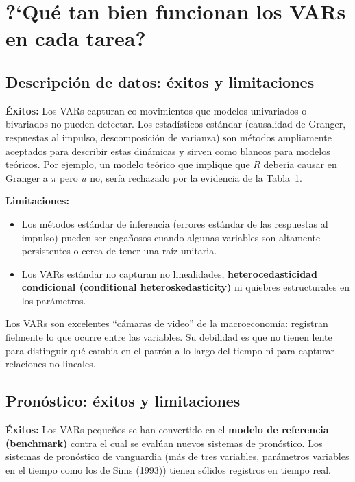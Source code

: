 \documentclass[12pt]{article}
\begin{document}
\section{?`Qu\'e tan bien funcionan los VARs en cada tarea?}

\subsection{Descripci\'on de datos: \'exitos y limitaciones}

\textbf{\'Exitos:} Los VARs capturan co-movimientos que modelos univariados o bivariados no pueden detectar. Los estad\'isticos est\'andar (causalidad de Granger, respuestas al impulso, descomposici\'on de varianza) son m\'etodos ampliamente aceptados para describir estas din\'amicas y sirven como blancos para modelos te\'oricos. Por ejemplo, un modelo te\'orico que implique que $R$ deber\'ia causar en Granger a $\pi$ pero $u$ no, ser\'ia rechazado por la evidencia de la Tabla~1.

\textbf{Limitaciones:}
\begin{itemize}
  \item Los m\'etodos est\'andar de inferencia (errores est\'andar de las respuestas al impulso) pueden ser enga\~nosos cuando algunas variables son altamente persistentes o cerca de tener una ra\'iz unitaria.
  \item Los VARs est\'andar no capturan no linealidades, \textbf{heterocedasticidad condicional (conditional heteroskedasticity)} ni quiebres estructurales en los par\'ametros.
\end{itemize}

\begin{intuicion}
Los VARs son excelentes ``c\'amaras de video'' de la macroeconom\'ia: registran fielmente lo que ocurre entre las variables. Su debilidad es que no tienen lente para distinguir qu\'e cambia en el patr\'on a lo largo del tiempo ni para capturar relaciones no lineales.
\end{intuicion}

\subsection{Pron\'ostico: \'exitos y limitaciones}

\textbf{\'Exitos:} Los VARs peque\~nos se han convertido en el \textbf{modelo de referencia (benchmark)} contra el cual se eval\'uan nuevos sistemas de pron\'ostico. Los sistemas de pron\'ostico de vanguardia (m\'as de tres variables, par\'ametros variables en el tiempo como los de Sims (1993)) tienen s\'olidos registros en tiempo real.
\end{document}
